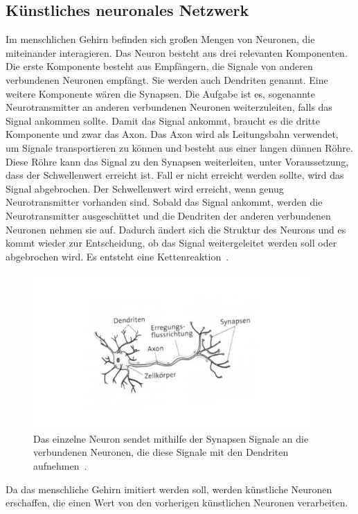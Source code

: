 \documentclass[11pt]{article}
\begin{document}
\subsection{Künstliches neuronales Netzwerk}\label{nn} %
Im menschlichen Gehirn befinden sich großen Mengen von Neuronen, die miteinander interagieren. 
Das Neuron besteht aus drei relevanten Komponenten. Die erste Komponente besteht aus Empfängern, die Signale von anderen verbundenen Neuronen empfängt.
Sie werden auch Dendriten genannt. Eine weitere Komponente wären die Synapsen. Die Aufgabe ist es, sogenannte Neurotransmitter an anderen verbundenen Neuronen
weiterzuleiten, falls das Signal ankommen sollte. Damit das Signal ankommt, braucht es die dritte Komponente und zwar das Axon. Das Axon wird als Leitungsbahn
verwendet, um Signale transportieren zu können und besteht aus einer langen dünnen Röhre. Diese Röhre kann das Signal zu den Synapsen weiterleiten, unter Voraussetzung, dass der Schwellenwert erreicht ist.
Fall er nicht erreicht werden sollte, wird das Signal abgebrochen. Der Schwellenwert wird erreicht, wenn genug Neurotransmitter vorhanden sind.
Sobald das Signal ankommt, werden die Neurotransmitter
ausgeschüttet und die Dendriten der anderen verbundenen Neuronen nehmen sie auf.
Dadurch ändert sich die Struktur des Neurons und es kommt wieder zur Entscheidung, ob das Signal weitergeleitet werden soll oder abgebrochen wird.
Es entsteht eine Kettenreaktion~\cite{11}.
\begin{figure}[h]
    \centering
    \includegraphics[width=300pt, keepaspectratio]{images/neuron}
    \caption[Aufbau eines Neuron~\cite{11}]{Das einzelne Neuron sendet mithilfe der Synapsen Signale an die verbundenen Neuronen, die diese Signale mit den Dendriten aufnehmen~\cite{11}.}
\end{figure}
Da das menschliche Gehirn imitiert werden soll, werden künstliche Neuronen erschaffen, die einen Wert von den vorherigen künstlichen Neuronen verarbeiten.
\end{document}

